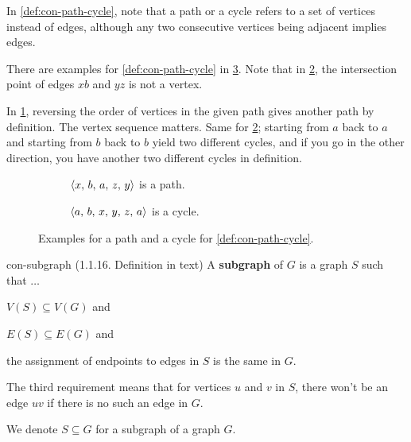 \documentclass[../src/handouts/main.tex]{subfiles}
\begin{document}
In \cref{def:con-path-cycle}, note that a path or a cycle refers to a set of vertices instead of edges, although any two consecutive vertices being adjacent implies edges.

There are examples for \cref{def:con-path-cycle} in \cref{fig:con-path-cycle}. Note that in \cref{fig:con-cycle}, the intersection point of edges $xb$ and $yz$ is not a vertex.

In \cref{fig:con-path}, reversing the order of vertices in the given path gives another path by definition. The vertex sequence matters. Same for \cref{fig:con-cycle}; starting from $a$ back to $a$ and starting from $b$ back to $b$ yield two different cycles, and if you go in the other direction, you have another two different cycles in definition.

\begin{figure}[ht]
  \def \nodelist {
    \node[main] (x) at (0, 1.5) {$x$}
    node[main] (y) at (0, 0) {$y$}
    node[main] (z) at (1.5, 1.5) {$z$}
    node[main] (b) at (1.5, 0) {$b$}
    node[main] (a) at (3, 0.75) {$a$};}

  \centering
  \begin{subfigure}{.3\textwidth}
    \centering
    \caption{$\langle x,\, b,\, a,\, z,\, y\rangle$ is a path.}
    \label{fig:con-path}
  \end{subfigure}
  \begin{subfigure}{.3\textwidth}
    \centering
    \caption{$\langle a,\, b,\, x,\, y,\, z,\, a\rangle$ is a cycle.}
    \label{fig:con-cycle}
  \end{subfigure}

  \caption{Examples for a path and a cycle for \cref{def:con-path-cycle}.}
  \label{fig:con-path-cycle}
\end{figure}

\begin{definition}{}{con-subgraph}
  (1.1.16. Definition in text)
  A \textbf{subgraph} of $G$ is a graph $S$ such that $\ldots$
  \begin{enumerate*}
    \item $V(S) \subseteq V(G)$ and
    \item $E(S) \subseteq E(G)$ and
    \item the assignment of endpoints to edges in $S$ is the same in $G$.
  \end{enumerate*}

  The third requirement means that for vertices $u$ and $v$ in $S$, there won't be an edge $uv$ if there is no such an edge in $G$.

  We denote $S \subseteq G$ for a subgraph of a graph $G$.
\end{definition}
\end{document}
